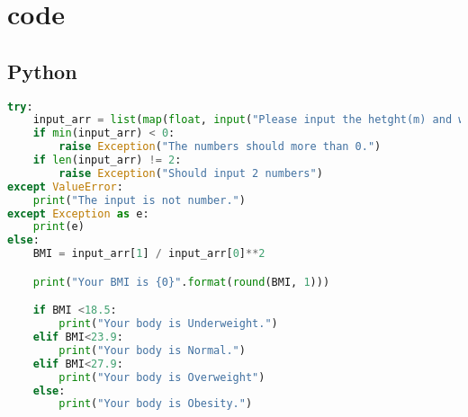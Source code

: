 \documentclass{math201}
\begin{document}
\section{code}

\subsection{Python}

\begin{lstlisting}[language=Python]
    try:
    input_arr = list(map(float, input("Please input the hetght(m) and weight(kg) number:").split()))
    if min(input_arr) < 0:
        raise Exception("The numbers should more than 0.")
    if len(input_arr) != 2:
        raise Exception("Should input 2 numbers")
except ValueError:
    print("The input is not number.")
except Exception as e:
    print(e)
else:
    BMI = input_arr[1] / input_arr[0]**2

    print("Your BMI is {0}".format(round(BMI, 1)))

    if BMI <18.5:
        print("Your body is Underweight.")
    elif BMI<23.9:
        print("Your body is Normal.")
    elif BMI<27.9:
        print("Your body is Overweight")
    else:
        print("Your body is Obesity.")

\end{lstlisting}
\end{document}
